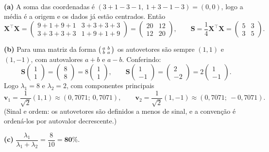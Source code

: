 \documentclass[11pt,a4paper]{article}
\begin{document}
\begin{solucao}
\textbf{(a)} A soma das coordenadas é
$(3+1-3-1,\ 1+3-1-3) = (0,0)$, logo a média é a origem e os dados já estão
centrados. Então
\[
  \bm X^\top\bm X =
  \begin{pmatrix} 9+1+9+1 & 3+3+3+3 \\ 3+3+3+3 & 1+9+1+9 \end{pmatrix}
  = \begin{pmatrix} 20 & 12 \\ 12 & 20 \end{pmatrix},
  \qquad
  \bm S = \frac14 \bm X^\top\bm X = \begin{pmatrix} 5 & 3 \\ 3 & 5 \end{pmatrix}.
\]

\smallskip
\textbf{(b)} Para uma matriz da forma $\begin{psmallmatrix}a&b\\b&a\end{psmallmatrix}$
os autovetores são sempre $(1,1)$ e $(1,-1)$, com autovalores $a+b$ e $a-b$.
Conferindo:
\[
  \bm S\begin{pmatrix}1\\1\end{pmatrix} = \begin{pmatrix}8\\8\end{pmatrix} = 8\begin{pmatrix}1\\1\end{pmatrix},
  \qquad
  \bm S\begin{pmatrix}1\\-1\end{pmatrix} = \begin{pmatrix}2\\-2\end{pmatrix} = 2\begin{pmatrix}1\\-1\end{pmatrix}.
\]
Logo $\lambda_1 = 8$ e $\lambda_2 = 2$, com componentes principais
\[
  \bm v_1 = \frac{1}{\sqrt2}(1,1) \approx (0{,}7071;\ 0{,}7071),
  \qquad
  \bm v_2 = \frac{1}{\sqrt2}(1,-1) \approx (0{,}7071;\ -0{,}7071).
\]
(Sinal e ordem: os autovetores são definidos a menos de sinal, e a convenção é
ordená-los por autovalor decrescente.)

\smallskip
\textbf{(c)} $\dfrac{\lambda_1}{\lambda_1+\lambda_2} = \dfrac{8}{10} = \mathbf{80\%}$.


\end{solucao}
\end{document}
